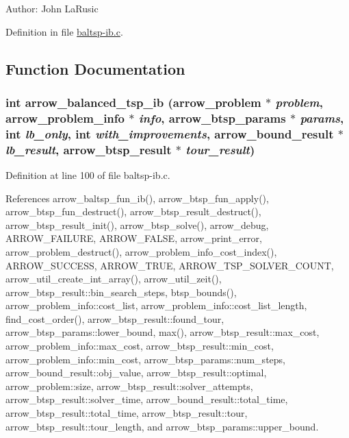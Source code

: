 \begin{Desc}
\item[Author:]John LaRusic \end{Desc}


Definition in file \hyperlink{lib_2baltsp_2baltsp-ib_8c-source}{baltsp-ib.c}.

\subsection{Function Documentation}
\hypertarget{lib_2baltsp_2baltsp-ib_8c_b416a4231c1efde53cc8191486a8db4d}{
\subsubsection[{arrow\_\-balanced\_\-tsp\_\-ib}]{\setlength{\rightskip}{0pt plus 5cm}int arrow\_\-balanced\_\-tsp\_\-ib ({\bf arrow\_\-problem} $\ast$ {\em problem}, \/  {\bf arrow\_\-problem\_\-info} $\ast$ {\em info}, \/  {\bf arrow\_\-btsp\_\-params} $\ast$ {\em params}, \/  int {\em lb\_\-only}, \/  int {\em with\_\-improvements}, \/  {\bf arrow\_\-bound\_\-result} $\ast$ {\em lb\_\-result}, \/  {\bf arrow\_\-btsp\_\-result} $\ast$ {\em tour\_\-result})}}
\label{lib_2baltsp_2baltsp-ib_8c_b416a4231c1efde53cc8191486a8db4d}




Definition at line 100 of file baltsp-ib.c.

References arrow\_\-baltsp\_\-fun\_\-ib(), arrow\_\-btsp\_\-fun\_\-apply(), arrow\_\-btsp\_\-fun\_\-destruct(), arrow\_\-btsp\_\-result\_\-destruct(), arrow\_\-btsp\_\-result\_\-init(), arrow\_\-btsp\_\-solve(), arrow\_\-debug, ARROW\_\-FAILURE, ARROW\_\-FALSE, arrow\_\-print\_\-error, arrow\_\-problem\_\-destruct(), arrow\_\-problem\_\-info\_\-cost\_\-index(), ARROW\_\-SUCCESS, ARROW\_\-TRUE, ARROW\_\-TSP\_\-SOLVER\_\-COUNT, arrow\_\-util\_\-create\_\-int\_\-array(), arrow\_\-util\_\-zeit(), arrow\_\-btsp\_\-result::bin\_\-search\_\-steps, btsp\_\-bounds(), arrow\_\-problem\_\-info::cost\_\-list, arrow\_\-problem\_\-info::cost\_\-list\_\-length, find\_\-cost\_\-order(), arrow\_\-btsp\_\-result::found\_\-tour, arrow\_\-btsp\_\-params::lower\_\-bound, max(), arrow\_\-btsp\_\-result::max\_\-cost, arrow\_\-problem\_\-info::max\_\-cost, arrow\_\-btsp\_\-result::min\_\-cost, arrow\_\-problem\_\-info::min\_\-cost, arrow\_\-btsp\_\-params::num\_\-steps, arrow\_\-bound\_\-result::obj\_\-value, arrow\_\-btsp\_\-result::optimal, arrow\_\-problem::size, arrow\_\-btsp\_\-result::solver\_\-attempts, arrow\_\-btsp\_\-result::solver\_\-time, arrow\_\-bound\_\-result::total\_\-time, arrow\_\-btsp\_\-result::total\_\-time, arrow\_\-btsp\_\-result::tour, arrow\_\-btsp\_\-result::tour\_\-length, and arrow\_\-btsp\_\-params::upper\_\-bound.

